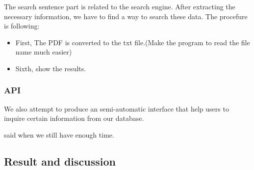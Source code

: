 The search sentence part is related to the search engine.
After extracting the necessary information, we have to find a way to search these data.
The procefure is following:
\begin{itemize}
	
	\item First, The PDF is converted to the txt file.(Make the program to read the file name much easier)

	\item Sixth, show the results.
	
\end{itemize}
\subsubsection{API}
We also attempt to produce an semi-automatic interface that help users to inquire certain information from our database. 

said when we still have enough time.
\subsection{Result and discussion}

\newpage %